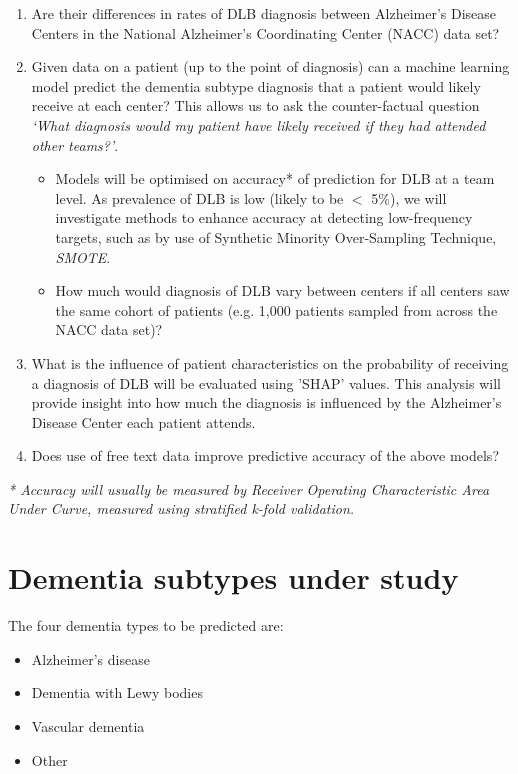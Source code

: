 \documentclass{article}
\begin{document}
\begin{enumerate}
    \item Are their differences in rates of DLB diagnosis between Alzheimer’s Disease Centers in the National Alzheimer’s Coordinating Center (NACC) data set?
    \item Given data on a patient (up to the point of diagnosis) can a machine learning model predict the dementia subtype diagnosis that a patient would likely receive at each center? This allows us to ask the counter-factual question \emph{`What diagnosis would my patient have likely received if they had attended other teams?'}. 
    \begin{itemize}
        \item Models will be optimised on accuracy* of prediction for DLB at a team level. As prevalence of DLB is low (likely to be $<$ 5\%), we will investigate methods to enhance accuracy at detecting low-frequency targets, such as by use of Synthetic Minority Over-Sampling Technique, \emph{SMOTE}\cite{chawla_smote_2002}.
        \item How much would diagnosis of DLB vary between centers if all centers saw the same cohort of patients (e.g. 1,000 patients sampled from across the NACC data set)?
    \end{itemize}
    \item What is the influence of patient characteristics on the probability of receiving a diagnosis of DLB will be evaluated using 'SHAP' values\cite{lundberg_unified_2017}. This analysis will provide insight into how much the diagnosis is influenced by the Alzheimer’s Disease Center each patient attends.
    \item Does use of free text data improve predictive accuracy of the above models?
\end{enumerate}

\emph{* Accuracy will usually be measured by Receiver Operating Characteristic Area Under Curve, measured using stratified k-fold validation.}


\section{Dementia subtypes under study}

The four dementia types to be predicted are:

\begin{itemize}
    \item Alzheimer’s disease
    \item Dementia with Lewy bodies
    \item Vascular dementia
    \item Other
\end{itemize}
\end{document}
